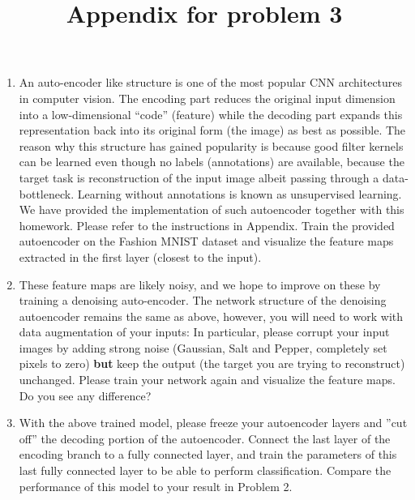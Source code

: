 \documentclass[a4paper]{article}
\begin{document}
\begin{enumerate}
\begin{enumerate}
			\item An auto-encoder like structure is one of the most popular CNN architectures in computer vision. The encoding part reduces the original input dimension into a low-dimensional ``code'' (feature) while the decoding part  expands this representation back into its original form (the image) as best as possible. The reason why this structure has gained popularity is because good filter kernels can be learned even though no labels (annotations) are available, because the target task is reconstruction of the input image albeit passing through a data-bottleneck. Learning without annotations is known as unsupervised learning. We have provided the implementation of such autoencoder together with this homework. Please refer to the instructions in Appendix.
			 Train the provided autoencoder on the Fashion MNIST dataset and visualize the feature maps extracted in the first layer (closest to the input).
			\item These feature maps are likely noisy, and we hope to improve on these by training a denoising auto-encoder. The network structure of the denoising autoencoder remains the same as above, however, you will need to work with data augmentation of your inputs: In particular, please corrupt your input images by adding strong noise (Gaussian, Salt and Pepper, completely set pixels to zero) \textbf{but} keep the output (the target you are trying to reconstruct) unchanged. Please train your network again and visualize the feature maps. Do you see any difference?
			\item With the above trained model, please freeze your autoencoder layers and ''cut off'' the decoding portion of the autoencoder. Connect the last layer of the encoding branch to a fully connected layer, and train the parameters of this last fully connected layer to be able to perform classification. Compare the performance of this model to your result in Problem 2.
		\end{enumerate}
		
	\end{enumerate}
	\newpage
	\title{Appendix for problem 3}	
\end{document}

